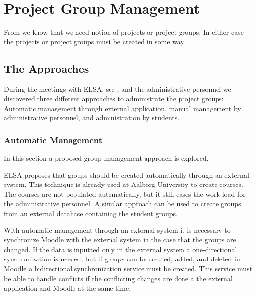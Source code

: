 \section{Project Group Management}
\label{sec:groupManagement}
From  we know that we need notion of projects or project groups. In either case the projects or project groups must be created in some way. 
\subsection{The Approaches} %
During the meetings with ELSA,  see , and the administrative personnel we discovered three different approaches to administrate the project groups: Automatic management through external application, manual management by administrative personnel, and administration by students. 




\subsubsection{Automatic Management}
In this section a proposed group management approach is explored.  

ELSA proposes that groups should be created automatically through an external system. 
This technique is already used at Aalborg University to create courses. 
The courses are not populated automatically, but it still eases the work load for the administrative personnel.  
A similar approach can be used to create groups from an external database containing the student groups. 

With automatic management through an external system it is necessary to synchronize Moodle with the external system in the case that the groups are changed. 
If the data is inputted only in the external system a one-directional synchronization is needed, but if groups can be created, added, and deleted in Moodle a bidirectional synchronization service must be created. 
This service must be able to handle conflicts if the conflicting changes are done a the external application and Moodle at the same time.


